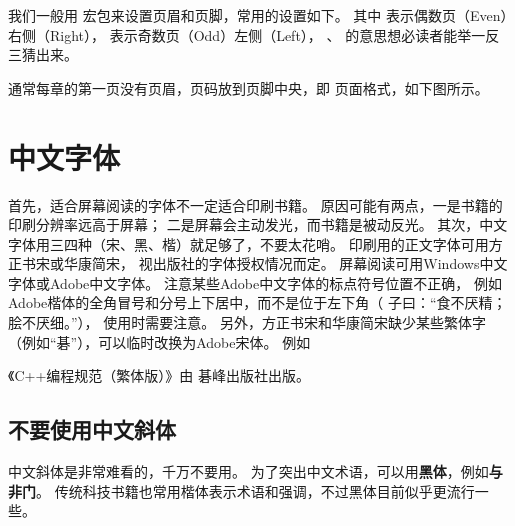 \vspace{1ex}
\centerline{%
\quad{}}

\vspace{1ex}
我们一般用  宏包来设置页眉和页脚，常用的设置如下。
其中  表示偶数页\linebreak（Even）右侧（Right），
 表示奇数页（Odd）左侧（Left），
、 的意思想必读者能举一反三猜出来。

\begin{Code}
\pagestyle{fancy}
\fancyhf{}
\fancyhead[RE]{\normalfont\small\rmfamily\nouppercase{\leftmark}}
\fancyhead[LO]{\normalfont\small\rmfamily\nouppercase{\rightmark}}
\fancyhead[LE,RO]{\thepage}
\end{Code}

通常每章的第一页没有页眉，页码放到页脚中央，即  页面格式，如下图所示。

\vspace{1ex}
\centerline{}

\section{中文字体} %

首先，适合屏幕阅读的字体不一定适合印刷书籍。
原因可能有两点，一是书籍的印刷分辨率远高于屏幕；
二是屏幕会主动发光，而书籍是被动反光。
其次，中文字体用三四种（宋、黑、楷）就足够了，不要太花哨。
印刷用的正文字体可用方正书宋或华康简宋，
视出版社的字体授权情况而定。
屏幕阅读可用Windows中文字体或Adobe中文字体。
注意某些Adobe中文字体的标点符号位置不正确，
例如Adobe楷体的全角冒号和分号上下居中，而不是位于左下角（
{子曰：“食不厌精；脍不厌细。”}），
使用时需要注意。
另外，方正书宋和华康简宋缺少某些繁体字（例如“碁”），可以临时改换为Adobe宋体。
例如
\begin{Code}
《C++编程规范（繁体版）》由{ 碁峰}出版社出版。
\end{Code}

\subsection{不要使用中文斜体}
\label{subsec:noChineseItalic}
中文斜体是非常难看的，千万不要用。
为了突出中文术语，可以用\textbf{黑体}，例如\textbf{与非门}。
传统科技书籍也常用{\kaishu 楷体}表示术语和强调，不过黑体目前似乎更流行一些。


